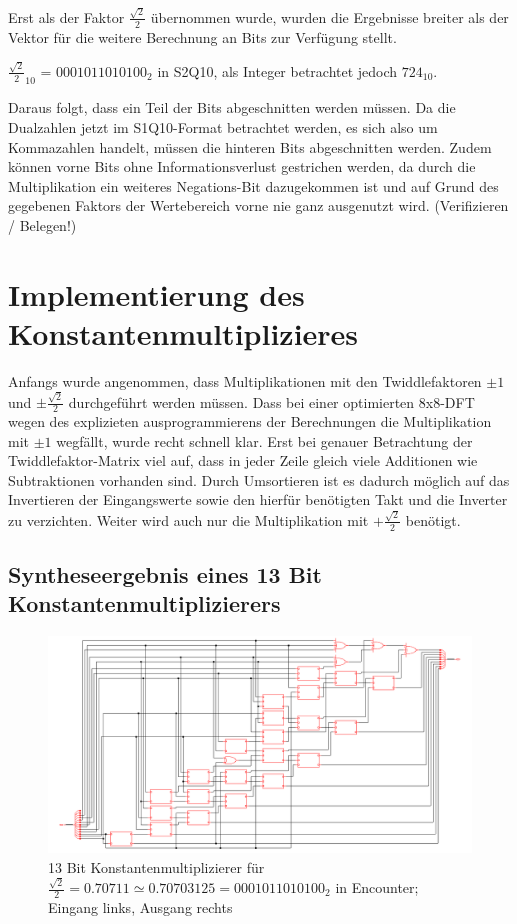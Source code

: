 Erst als der Faktor $\frac{\sqrt{2}}{2}$ übernommen wurde, wurden die Ergebnisse breiter als der Vektor für die weitere Berechnung an Bits zur Verfügung stellt.

${\frac{\sqrt{2}}{2}}_{10}$ = $0001011010100_2$ in S2Q10, als Integer betrachtet jedoch $724_{10}$.

Daraus folgt, dass ein Teil der Bits abgeschnitten werden müssen. Da die Dualzahlen jetzt im S1Q10-Format betrachtet werden, es sich also um Kommazahlen handelt,
müssen die hinteren Bits abgeschnitten werden. Zudem können vorne Bits ohne Informationsverlust gestrichen werden, da durch die Multiplikation ein weiteres 
Negations-Bit dazugekommen ist und auf Grund des gegebenen Faktors der Wertebereich vorne nie ganz ausgenutzt wird. (Verifizieren / Belegen!)


\section{Implementierung des Konstantenmultiplizieres}\label{sec:Konstantenmultiplizierer}

Anfangs wurde angenommen, dass Multiplikationen mit den Twiddlefaktoren $\pm 1$ und $\pm\frac{\sqrt{2}}{2}$ durchgeführt werden müssen. 
Dass bei einer optimierten 8x8-DFT wegen des explizieten ausprogrammierens der Berechnungen die Multiplikation mit $\pm1$ wegfällt, wurde recht schnell klar.
Erst bei genauer Betrachtung der Twiddlefaktor-Matrix viel auf, dass in jeder Zeile gleich viele Additionen wie Subtraktionen vorhanden sind. Durch Umsortieren 
ist es dadurch möglich auf das Invertieren der Eingangswerte sowie den hierfür benötigten Takt und die Inverter zu verzichten. Weiter wird auch nur die Multiplikation
mit $+\frac{\sqrt{2}}{2}$ benötigt.

\subsection{Syntheseergebnis eines 13 Bit Konstantenmultiplizierers}\label{sec:SyntheseergebnisKonstantenmultiplizierer}
\begin{figure}[!ht]
\centering  
  \includegraphics[width=1\textwidth]{img/13Bit_Konstantenmultiplizierer_Netlist.png}
  \caption{13 Bit Konstantenmultiplizierer für $\frac{\sqrt{2}}{2} = 0.70711 \simeq 0.70703125 = 0001011010100_2$ in Encounter; Eingang links, Ausgang rechts}
  \label{pic:Konstantenmultiplizierer}
\end{figure}



